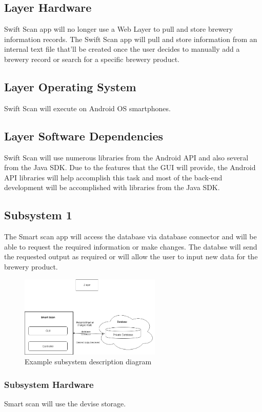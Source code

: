 \subsection{Layer Hardware}
Swift Scan app will no longer use a Web Layer to pull and store brewery information records.  The Swift Scan app will pull and store information from an internal text file that'll be created once the user decides to manually add a brewery record or search for a specific brewery product.

\subsection{Layer Operating System}
Swift Scan will execute on Android OS smartphones.

\subsection{Layer Software Dependencies}
Swift Scan will use numerous libraries from the Android API and also several from the Java SDK.  Due to the features that the GUI will provide, the Android API libraries will help accomplish this task and most of the back-end development will be accomplished with libraries from the Java SDK.

\subsection{Subsystem 1}
The Smart scan app will access the database via database connector and will be able to request the required information or make changes.
The databse will send the requested output as required or will allow the user to input new data for the brewery product.
\begin{figure}[h!]
	\centering
 	\includegraphics[width=0.60\textwidth]{images/zlayer}
 \caption{Example subsystem description diagram}
\end{figure}

\subsubsection{Subsystem Hardware}
Smart scan will use the devise storage.
